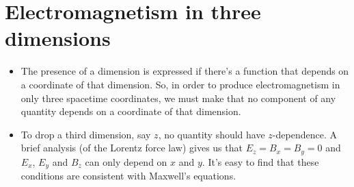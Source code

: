 \documentclass[12pt]{report}
\begin{document}
\section{Electromagnetism in three dimensions}
\begin{itemize}
    \item The presence of a dimension is expressed if there's a function that depends on a coordinate of that dimension. So, in order to produce electromagnetism in only three spacetime coordinates, we must make that no component of any quantity depends on a coordinate of that dimension.
    \item To drop a third dimension, say $z$, no quantity should have $z$-dependence. A brief analysis (of the Lorentz force law) gives us that $E_z = B_x = B_y = 0$ and $E_x$, $E_y$ and $B_z$ can only depend on $x$ and $y$. It's easy to find that these conditions are consistent with Maxwell's equations.
\end{itemize}
\end{document}
